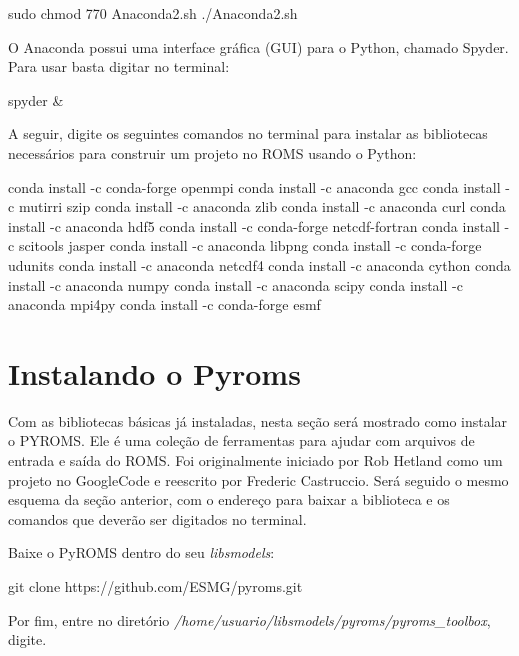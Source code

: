\begin{bashcode}
 sudo chmod 770 Anaconda2.sh
 ./Anaconda2.sh
\end{bashcode}
\bigskip

\noindent O Anaconda possui uma interface gráfica (GUI) para o Python, chamado Spyder. Para usar basta digitar no terminal:
\bigskip

\begin{bashcode}
spyder &
\end{bashcode}
\bigskip

\noindent A seguir, digite os seguintes comandos no terminal para instalar as bibliotecas necessários para construir um projeto no ROMS usando o Python:
\bigskip

\begin{bashcode}
conda install -c conda-forge openmpi
conda install -c anaconda gcc
conda install -c mutirri szip
conda install -c anaconda zlib
conda install -c anaconda curl
conda install -c anaconda hdf5
conda install -c conda-forge netcdf-fortran
conda install -c scitools jasper
conda install -c anaconda libpng
conda install -c conda-forge udunits
conda install -c anaconda netcdf4
conda install -c anaconda cython
conda install -c anaconda numpy
conda install -c anaconda scipy
conda install -c anaconda mpi4py
conda install -c conda-forge esmf
\end{bashcode}
\bigskip

\section{Instalando o Pyroms}
\bigskip

\noindent Com as bibliotecas básicas já instaladas, nesta seção será mostrado como instalar o PYROMS. Ele é uma coleção de ferramentas para ajudar com arquivos de entrada e saída do ROMS. Foi originalmente iniciado por Rob Hetland como um projeto no GoogleCode e reescrito por Frederic Castruccio. Será seguido o mesmo esquema da seção anterior, com o endereço para baixar a biblioteca e os comandos que deverão ser digitados no terminal.
\bigskip

\noindent Baixe o PyROMS dentro do seu \textit{libsmodels}:
\bigskip

\begin{bashcode}
git clone https://github.com/ESMG/pyroms.git
\end{bashcode}
\bigskip

\noindent Por fim, entre no diretório \textit{/home/usuario/libsmodels/pyroms/pyroms\_toolbox}, digite.
\bigskip


